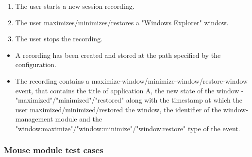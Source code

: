 \begin{tests}
	{\begin{enumerate}
		\item The user starts a new session recording.
		\item The user maximizes/minimizes/restores a "Windows Explorer" window.
		\item The user stops the recording.
	\end{enumerate}}
	{\begin{itemize}
		\item A recording has been created and stored at the path specified by the configuration.
		\item The recording contains a maximize-window/minimize-window/restore-window event, that contains the title of application A, the new state of the window - "maximized"/"minimized"/"restored" along with the timestamp at which the user maximized/minimized/restored the window, the identifier of the window-management module and the "window:maximize"/"window:minimize"/"window:restore" type of the event.
	\end{itemize}}
\end{tests}

\subsubsection{Mouse module test cases}

